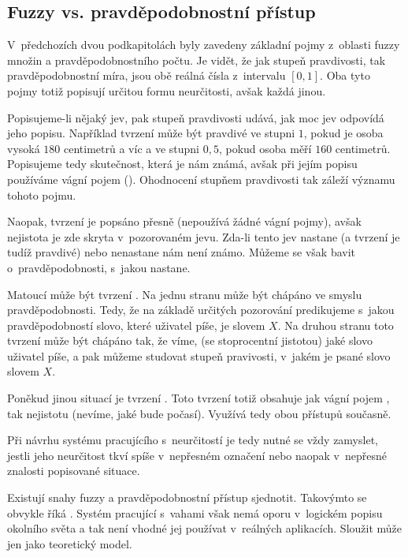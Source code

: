 \subsection{Fuzzy vs. pravděpodobnostní přístup} \label{subsec:FuzzyVsProb}
V~předchozích dvou podkapitolách byly zavedeny základní pojmy z~oblasti fuzzy množin a pravděpodobnostního počtu. Je vidět, že jak stupeň pravdivosti, tak pravděpodobnostní míra, jsou obě reálná čísla z~intervalu $[0, 1]$. Oba tyto pojmy totiž popisují určitou formu neurčitosti, avšak každá jinou. 

Popisujeme-li nějaký jev, pak stupeň pravdivosti udává, jak moc jev odpovídá jeho popisu. Například tvrzení  může být pravdivé ve stupni $1$, pokud je osoba vysoká $180$ centimetrů a víc a ve stupni $0{,}5$, pokud osoba měří $160$ centimetrů. Popisujeme tedy skutečnost, která je nám známá, avšak při jejím popisu používáme vágní pojem (). Ohodnocení stupňem pravdivosti tak záleží významu tohoto pojmu.

Naopak, tvrzení  je popsáno přesně (nepoužívá žádné vágní pojmy), avšak nejistota je zde skryta v~pozorovaném jevu. Zda-li tento jev nastane (a tvrzení je tudíž pravdivé) nebo nenastane nám není známo. Můžeme se však bavit o~pravděpodobnosti, s~jakou nastane.

Matoucí může být tvrzení . Na jednu stranu může být chápáno ve smyslu pravděpodobnosti. Tedy, že na základě určitých pozorování predikujeme s~jakou pravděpodobností slovo, které uživatel píše, je slovem $X$. Na druhou stranu toto tvrzení může být chápáno tak, že víme, (se stoprocentní jistotou) jaké slovo uživatel píše, a pak můžeme studovat stupeň pravivosti, v~jakém je psané slovo slovem $X$.

Poněkud jinou situací je tvrzení . Toto tvrzení totiž obsahuje jak vágní pojem , tak nejistotu (nevíme, jaké bude počasí). Využívá tedy obou přístupů současně.

Při návrhu systému pracujícího s~neurčitostí je tedy nutné se vždy zamyslet, jestli jeho neurčitost tkví spíše v~nepřesném označení nebo naopak v~nepřesné znalosti popisované situace.

\begin{note}
 Existují snahy fuzzy a pravděpodobnostní přístup sjednotit. Takovýmto  se obvykle říká . Systém pracující s~vahami však nemá oporu v~logickém popisu okolního světa a tak není vhodné jej používat v~reálných aplikacích. Sloužit může jen jako teoretický model.
\end{note}


